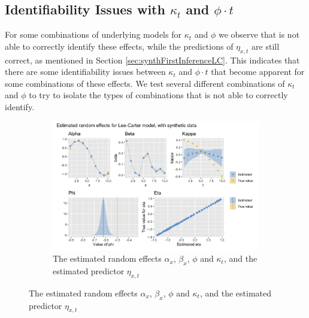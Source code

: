 \subsection{Identifiability Issues with $\kappa_t$ and $\phi\cdot t$}
\label{sec:IdentifiabilityKappa}
For some combinations of underlying models for $\kappa_t$ and $\phi$ we observe that \inlabru is not able to correctly identify these effects, while the predictions of $\eta_{x,t}$ are still correct, as mentioned in Section \ref{sec:synthFirstInferenceLC}. This indicates that there are some identifiability issues between $\kappa_t$ and $\phi \cdot t$ that become apparent for some combinations of these effects. We test several different combinations of $\kappa_t$ and $\phi$ to try to isolate the types of combinations that \inlabru is not able to correctly identify.
\begin{figure}[h!]
    \centering
    \begin{subfigure}[b]{0.85\textwidth}
        \includegraphics[width=\textwidth]{synthetic-data/Figures/effects-LC-synthetic-identifiability.png}
        \caption{The estimated random effects $\alpha_x$, $\beta_x$, $\phi$ and $\kappa_t$, and the estimated predictor $\eta_{x,t}$}
        \label{fig:unidentifiabilityKappa-top}
    \end{subfigure}
    

\end{figure}
